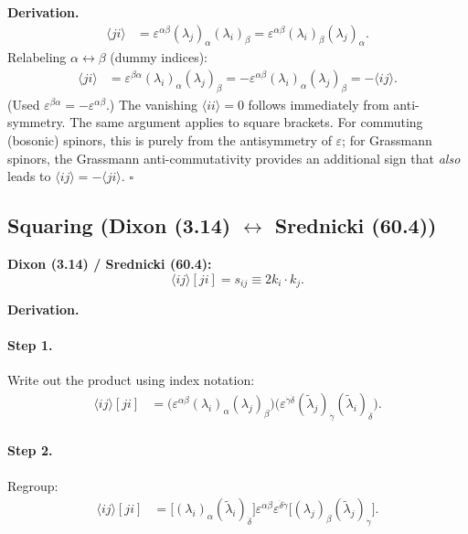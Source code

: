 \textbf{Derivation.}
\begin{align}
  \langle ji\rangle &= \varepsilon^{\alpha\beta}(\lambda_j)_\alpha(\lambda_i)_\beta
  = \varepsilon^{\alpha\beta}(\lambda_i)_\beta(\lambda_j)_\alpha.
\end{align}
Relabeling $\alpha\leftrightarrow\beta$ (dummy indices):
\begin{align}
  \langle ji\rangle &= \varepsilon^{\beta\alpha}(\lambda_i)_\alpha(\lambda_j)_\beta
  = -\varepsilon^{\alpha\beta}(\lambda_i)_\alpha(\lambda_j)_\beta = -\langle ij\rangle.
\end{align}
(Used $\varepsilon^{\beta\alpha}=-\varepsilon^{\alpha\beta}$.) The vanishing $\langle ii\rangle=0$
follows immediately from anti-symmetry. The same argument applies to square brackets.
For commuting (bosonic) spinors, this is purely from the antisymmetry of $\varepsilon$;
for Grassmann spinors, the Grassmann anti-commutativity provides an additional sign that
\emph{also} leads to $\langle ij\rangle=-\langle ji\rangle$. $\square$

\subsection{Squaring (Dixon (3.14) $\leftrightarrow$ Srednicki (60.4))}

\textbf{Dixon (3.14) / Srednicki (60.4):}
\begin{equation}
  \langle ij\rangle[ji] = s_{ij} \equiv 2k_i\cdot k_j.
  \tag{Dixon 3.14 / Sred 60.4}
\end{equation}

\textbf{Derivation.}

\paragraph{Step 1.} Write out the product using index notation:
\begin{align}
  \langle ij\rangle[ji]
  &= \bigl(\varepsilon^{\alpha\beta}(\lambda_i)_\alpha(\lambda_j)_\beta\bigr)
     \bigl(\varepsilon^{\dot\gamma\dot\delta}(\tilde\lambda_j)_{\dot\gamma}(\tilde\lambda_i)_{\dot\delta}\bigr).
\end{align}

\paragraph{Step 2.} Regroup:
\begin{align}
  \langle ij\rangle[ji]
  &= \bigl[(\lambda_i)_\alpha(\tilde\lambda_i)_{\dot\delta}\bigr]
     \varepsilon^{\alpha\beta}\varepsilon^{\dot\delta\dot\gamma}
     \bigl[(\lambda_j)_\beta(\tilde\lambda_j)_{\dot\gamma}\bigr].
\end{align}


